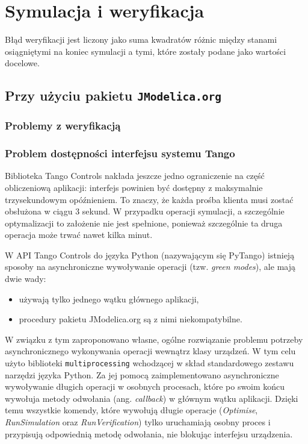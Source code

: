 \section{Symulacja i weryfikacja}
\label{sec:sym-wer}

Błąd weryfikacji jest liczony jako suma kwadratów różnic między stanami osiągniętymi na koniec symulacji a tymi, które zostały podane jako wartości docelowe.

\subsection{Przy użyciu pakietu \texttt{JModelica.org}}
\label{sub:sym-wer-jmodelica}

\subsubsection{Problemy z weryfikacją}

\subsubsection{Problem dostępności interfejsu systemu Tango}

Biblioteka Tango Controls nakłada jeszcze jedno ograniczenie na część obliczeniową aplikacji: interfejs powinien być dostępny z maksymalnie trzysekundowym opóźnieniem. To znaczy, że każda prośba klienta musi zostać obsłużona w ciągu 3 sekund. W przypadku operacji symulacji, a szczególnie optymalizacji to założenie nie jest spełnione, ponieważ szczególnie ta druga operacja może trwać nawet kilka minut.

W API Tango Controls do języka Python (nazywającym się PyTango) istnieją sposoby na asynchroniczne wywoływanie operacji (tzw. \emph{green modes}), ale mają dwie wady:
\begin{itemize}
    \item używają tylko jednego wątku głównego aplikacji,
    \item procedury pakietu JModelica.org są z nimi niekompatybilne.
\end{itemize}

W związku z tym zaproponowano własne, ogólne rozwiązanie problemu potrzeby asynchronicznego wykonywania operacji wewnątrz klasy urządzeń. W tym celu użyto biblioteki \texttt{multiprocessing} wchodzącej w skład standardowego zestawu narzędzi języka Python. Za jej pomocą zaimplementowano asynchroniczne wywoływanie długich operacji w osobnych procesach, które po swoim końcu wywołuja metody odwołania (ang. \emph{callback}) w głównym wątku aplikacji. Dzięki temu wszystkie komendy, które wywołują długie operacje (\emph{Optimise}, \emph{RunSimulation} oraz \emph{RunVerification}) tylko uruchamiają osobny proces i przypisują odpowiednią metodę odwołania, nie blokując interfejsu urządzenia.

